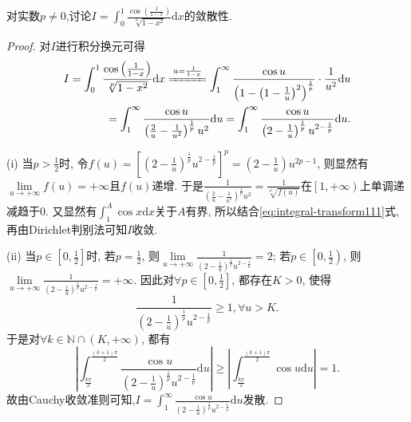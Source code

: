 \documentclass[../../main.tex]{subfiles}
\begin{document}
\begin{example}
对实数$p\ne 0$,讨论$I = \int_0^1{\frac{\cos(\frac{1}{1 - x})}{\sqrt[p]{1 - x^2}}\mathrm{d}x}$的敛散性.
\end{example}
\begin{proof}
对$I$进行积分换元可得
\begin{align}
I=\int_0^1{\frac{\cos\left(\frac{1}{1-x}\right)}{\sqrt[p]{1-x^2}}\mathrm{d}x}\xlongequal{u=\frac{1}{1-x}}\int_1^{\infty}{\frac{\cos u}{\left( 1-\left( 1-\frac{1}{u} \right) ^2 \right) ^{\frac{1}{p}}}\cdot \frac{1}{u^2}\mathrm{d}u} \notag \\
=\int_1^{\infty}{\frac{\cos u}{\left( \frac{2}{u}-\frac{1}{u^2} \right) ^{\frac{1}{p}}u^2}\mathrm{d}u}=\int_1^{\infty}{\frac{\cos u}{\left( 2-\frac{1}{u} \right) ^{\frac{1}{p}}u^{2-\frac{1}{p}}}\mathrm{d}u}.\label{eq:integral-transform111}
\end{align}

(i) 当$p>\frac{1}{2}$时, 令$f\left( u \right) =\left[ \left( 2-\frac{1}{u} \right) ^{\frac{1}{p}}u^{2-\frac{1}{p}} \right] ^p=\left( 2-\frac{1}{u} \right) u^{2p-1}$, 则显然有$\underset{u\rightarrow +\infty}{\lim}f\left( u \right) =+\infty$且$f\left( u \right)$递增. 于是$\frac{1}{\left( \frac{2}{u}-\frac{1}{u^2} \right) ^{\frac{1}{p}}u^2}=\frac{1}{\sqrt[p]{f\left( u \right)}}$在$\left[ 1,+\infty \right)$上单调递减趋于$0$. 又显然有$\int_1^A{\cos x\mathrm{d}x}$关于$A$有界, 所以结合\eqref{eq:integral-transform111}式, 再由Dirichlet判别法可知$I$收敛.

(ii) 当$p\in \left[ 0,\frac{1}{2} \right]$时, 若$p=\frac{1}{2}$, 则$\underset{u\rightarrow +\infty}{\lim}\frac{1}{\left( 2-\frac{1}{u} \right) ^{\frac{1}{p}}u^{2-\frac{1}{p}}}=2$; 若$p\in \left[ 0,\frac{1}{2} \right)$, 则$\underset{u\rightarrow +\infty}{\lim}\frac{1}{\left( 2-\frac{1}{u} \right) ^{\frac{1}{p}}u^{2-\frac{1}{p}}}=+\infty$. 因此对$\forall p\in \left[ 0,\frac{1}{2} \right]$, 都存在$K>0$, 使得
$$\frac{1}{\left( 2-\frac{1}{u} \right) ^{\frac{1}{p}}u^{2-\frac{1}{p}}}\geqslant 1,\forall u>K.$$
于是对$\forall k\in \mathbb{N} \cap \left( K,+\infty \right)$, 都有
$$\left| \int_{\frac{k\pi}{2}}^{\frac{\left( k+1 \right) \pi}{2}}{\frac{\cos u}{\left( 2-\frac{1}{u} \right) ^{\frac{1}{p}}u^{2-\frac{1}{p}}}\mathrm{d}u} \right|\geqslant \left| \int_{\frac{k\pi}{2}}^{\frac{\left( k+1 \right) \pi}{2}}{\cos u\mathrm{d}u} \right|=1.$$
故由Cauchy收敛准则可知,$I=\int_1^{\infty}{\frac{\cos u}{\left( 2-\frac{1}{u} \right) ^{\frac{1}{p}}u^{2-\frac{1}{p}}}\mathrm{d}u}$发散.


\end{proof}
\end{document}
